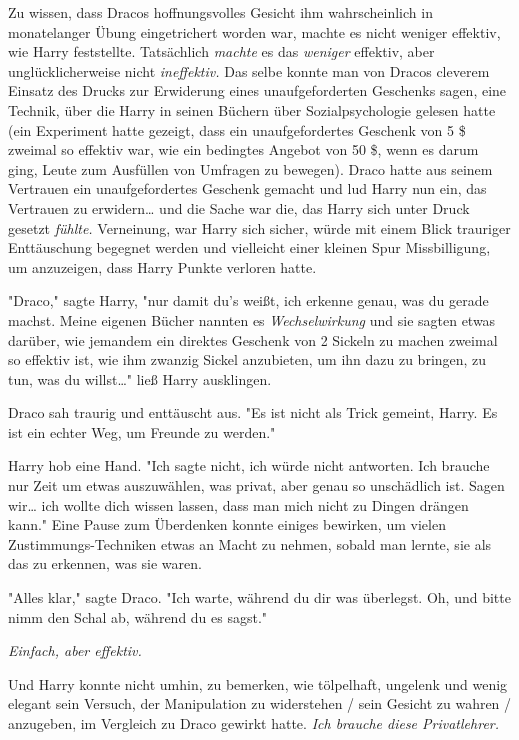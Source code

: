 {Zu wissen, dass Dracos hoffnungsvolles Gesicht ihm wahrscheinlich in monatelanger Übung eingetrichert worden war, machte es nicht weniger effektiv, wie Harry feststellte. Tatsächlich \emph{machte} es das \emph{weniger} effektiv, aber unglücklicherweise nicht \emph{ineffektiv.} Das selbe konnte man von Dracos cleverem Einsatz des Drucks zur Erwiderung eines unaufgeforderten Geschenks sagen, eine Technik, über die Harry in seinen Büchern über Sozialpsychologie gelesen hatte (ein Experiment hatte gezeigt, dass ein unaufgefordertes Geschenk von 5 \$ zweimal so effektiv war, wie ein bedingtes Angebot von 50 \$, wenn es darum ging, Leute zum Ausfüllen von Umfragen zu bewegen). Draco hatte aus seinem Vertrauen ein unaufgefordertes Geschenk gemacht und lud Harry nun ein, das Vertrauen zu erwidern… und die Sache war die, das Harry sich unter Druck gesetzt \emph{fühlte.} Verneinung, war Harry sich sicher, würde mit einem Blick trauriger Enttäuschung begegnet werden und vielleicht einer kleinen Spur Missbilligung, um anzuzeigen, dass Harry Punkte verloren hatte.

"Draco," sagte Harry, "nur damit du's weißt, ich erkenne genau, was du gerade machst. Meine eigenen Bücher nannten es \emph{Wechselwirkung} und sie sagten etwas darüber, wie jemandem ein direktes Geschenk von 2 Sickeln zu machen zweimal so effektiv ist, wie ihm zwanzig Sickel anzubieten, um ihn dazu zu bringen, zu tun, was du willst…" ließ Harry ausklingen.

Draco sah traurig und enttäuscht aus. "Es ist nicht als Trick gemeint, Harry. Es ist ein echter Weg, um Freunde zu werden."

Harry hob eine Hand. "Ich sagte nicht, ich würde nicht antworten. Ich brauche nur Zeit um etwas auszuwählen, was privat, aber genau so unschädlich ist. Sagen wir… ich wollte dich wissen lassen, dass man mich nicht zu Dingen drängen kann." Eine Pause zum Überdenken konnte einiges bewirken, um vielen Zustimmungs-Techniken etwas an Macht zu nehmen, sobald man lernte, sie als das zu erkennen, was sie waren.

"Alles klar," sagte Draco. "Ich warte, während du dir was überlegst. Oh, und bitte nimm den Schal ab, während du es sagst."

\emph{Einfach, aber effektiv.}

Und Harry konnte nicht umhin, zu bemerken, wie tölpelhaft, ungelenk und wenig elegant sein Versuch, der Manipulation zu widerstehen / sein Gesicht zu wahren / anzugeben, im Vergleich zu Draco gewirkt hatte. \emph{Ich brauche diese Privatlehrer.}

}
